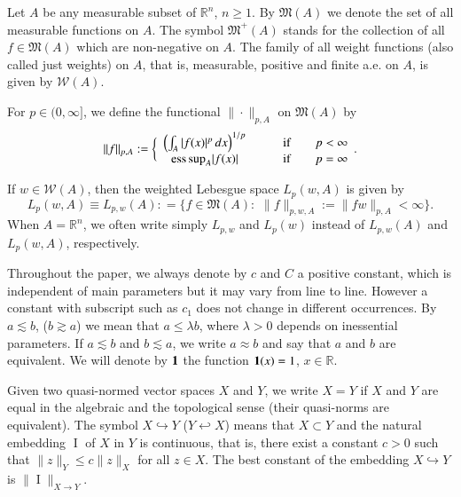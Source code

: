 \documentclass[11pt]{amsart}
\theoremstyle{plain}
\theoremstyle{definition}
\numberwithin{thm}{section}
\numberwithin{equation}{section}
\begin{document}
Let $A$ be any measurable subset of ${{\mathbb R}^n}$, $n \ge 1$. By ${{\mathfrak M}} (A)$
we denote the set of all measurable functions on $A$. The symbol
${{\mathfrak M}}^+ (A)$ stands for the collection of all $f\in{{\mathfrak M}} (A)$ which
are non-negative on $A$. The family of all weight functions (also
called just weights) on $A$, that is, measurable, positive and
finite a.e. on $A$, is given by ${{\mathcal W}} (A)$.

For $p\in (0,{\infty}]$, we define the functional
$\|\cdot\|_{p,A}$ on ${{\mathfrak M}} (A)$ by
\begin{equation*}
\|f\|_{p,A} : = \bigg\{\begin{array}{cl}
\left(\int_A |f(x)|^p \,dx \right)^{1/p} & {\qquad}\mbox{if}{\qquad} p<{\infty} \\
{\operatornamewithlimits{ess\,sup}}_{A} |f(x)| & {\qquad}\mbox{if}{\qquad} p={\infty}
\end{array}
\bigg..
\end{equation*}

If $w\in {{\mathcal W}}(A)$, then the weighted Lebesgue space
$L_p(w,A)$ is given by
\begin{equation*}
L_{p}(w,A) \equiv L_{p,w}(A) : = \{f\in {{\mathfrak M}} (A):\,\, \|f\|_{p,w,A} := \|fw\|_{p,A} < \infty \}.
\end{equation*}
When $A={{\mathbb R}^n}$, we often write simply $L_{p,w}$ and $L_p(w)$ instead of $L_{p,w}(A)$ and $L_p(w,A)$, respectively. 

Throughout the paper, we always denote by $c$ and $C$ a positive
constant, which is independent of main parameters but it may vary
from line to line. However a constant with subscript
such as $c_1$ does not change in different occurrences. By
$a\lesssim b$, ($b\gtrsim a$) we mean that $a\leq {\lambda} b$, where
${\lambda}>0$ depends on inessential parameters. If $a\lesssim b$ and
$b\lesssim a$, we write $a\approx b$ and say that $a$ and $b$ are
equivalent.  We will denote by $\bf 1$ the function ${\bf 1}(x) =
1$, $x \in {\mathbb R}$.

Given two quasi-normed vector spaces $X$ and $Y$, we write $X=Y$ if
$X$ and $Y$ are equal in the algebraic and the topological sense
(their quasi-norms are equivalent). The symbol $X\hookrightarrow Y$
($Y \hookleftarrow X$) means that $X\subset Y$ and the natural
embedding ${\operatorname{I}}$ of $X$ in $Y$ is continuous, that is, there exist a
constant $c > 0$ such that $\|z\|_Y \le c\|z\|_X$ for all $z\in X$.
The best constant of the embedding $X\hookrightarrow Y$ is
$\|{\operatorname{I}}\|_{X {\rightarrow} Y}$.
\end{document}
